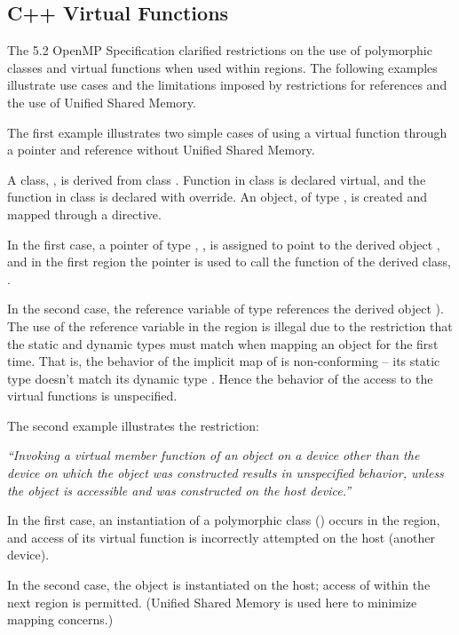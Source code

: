 \begin{cppspecific}[4ex]
\section{C++ Virtual Functions}
\label{sec:virtual_functions}


The 5.2 OpenMP Specification clarified restrictions on the use 
of polymorphic classes and virtual functions when used within 
 regions. The following examples illustrate 
use cases and the limitations imposed by restrictions for
references and the use of Unified Shared Memory. 

The first example illustrates two simple cases of using a virtual function
through a pointer and reference without Unified Shared Memory. 

A class, , is derived from class .  
Function  in class  is declared
virtual, and the function  in class  is declared with override.
An object,  of type , is created and mapped through a 
directive.

In the first case, a pointer of type , , is assigned to point 
to the derived object , and in the first  region the pointer
is used to call the  function of the derived class, .

In the second case, the reference variable  of type  references 
the derived object ).  The use of the reference variable  
in the  region is illegal due to the restriction that the static and dynamic 
types must match when mapping an object for the first time.
That is, the behavior of the implicit map of  
is non-conforming -- its static type  doesn't match its dynamic type .  
Hence the behavior of the access to the virtual functions is unspecified.


The second example illustrates the restriction:

\emph{``Invoking a virtual member function of an object on a device other than the device on which the
object was constructed results in unspecified behavior, unless the object is accessible and was
constructed on the host device.''}

In the first case, an instantiation  of a polymorphic class () occurs in the 
 region, and access of its virtual function
is incorrectly attempted on the host (another device).

In the second case, the object  is instantiated on the host; access of  within
the next  region is permitted. (Unified Shared Memory is
used here to minimize mapping concerns.)

\end{cppspecific}
